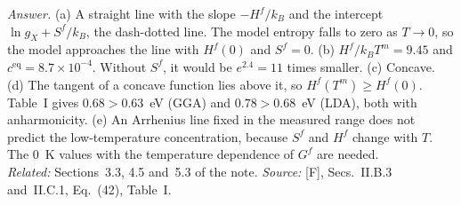 \documentclass[11pt]{article}      %
\numberwithin{equation}{section}   %
\begin{document}
\textit{Answer.} (a) A straight line with the slope $-H^f/k_B$ and the intercept $\ln g_X + S^f/k_B$, the dash-dotted line. The model entropy falls to zero as $T \to 0$, so the model approaches the line with $H^f(0)$ and $S^f = 0$. (b) $H^f/k_BT^m = 9.45$ and $c^{\text{eq}} = 8.7\times10^{-4}$. Without $S^f$, it would be $e^{2.4} = 11$ times smaller. (c) Concave. (d) The tangent of a concave function lies above it, so $H^f(T^m) \ge H^f(0)$. Table~I gives $0.68 > 0.63$~eV (GGA) and $0.78 > 0.68$~eV (LDA), both with anharmonicity. (e) An Arrhenius line fixed in the measured range does not predict the low-temperature concentration, because $S^f$ and $H^f$ change with $T$. The $0$~K values with the temperature dependence of $G^f$ are needed.\\
\textit{Related:} Sections~3.3, 4.5 and~5.3 of the note. \textit{Source:} [F], Secs.~II.B.3 and~II.C.1, Eq.~(42), Table~I.
\end{document}
